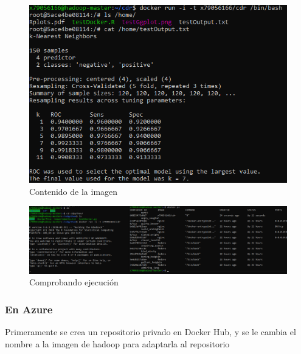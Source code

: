\begin{figure}[H]\center\includegraphics[width=.95\linewidth]{img/r/r2.png}\caption{Contenido de la imagen}\end{figure}

\begin{figure}[H]\center\includegraphics[width=.95\linewidth]{img/r/r4.png}\caption{Comprobando ejecución}\end{figure}

\subsubsection{En Azure}

Primeramente se crea un repositorio privado en Docker Hub, y se le cambia el nombre a la imagen de hadoop para adaptarla al repositorio

